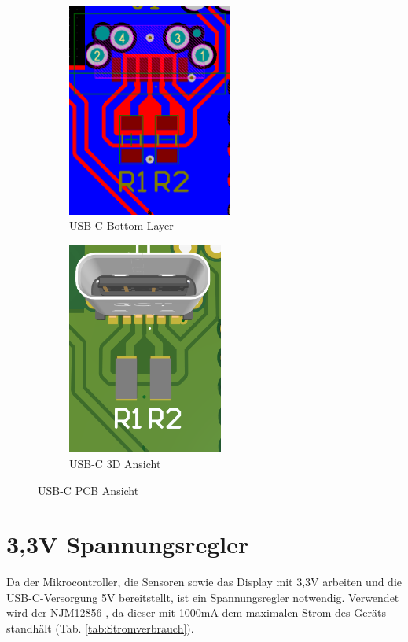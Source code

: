 \begin{inhalt}
\begin{figure}[H]
  \begin{subfigure}[b]{0.48\textwidth}
    \centering
    \includegraphics[height=7cm]{files/Tobias/pics/Schaltungen/PCB/USB_C_PCB.PNG}
    \caption{USB-C Bottom Layer}
    \label{fig:USB-C_Bottom_layer}
  \end{subfigure}
  \hfill
  \begin{subfigure}[b]{0.48\textwidth}
    \centering
    \includegraphics[height=7cm]{files/Tobias/pics/Schaltungen/PCB/USB_C_PCB_3D.PNG}
    \caption{USB-C 3D Ansicht}
    \label{fig:USB-C_3D_Ansicht}
  \end{subfigure}

  \caption{USB-C PCB Ansicht}
  \label{fig:pcb_layers}
\end{figure}



      \section{3,3V Spannungsregler}

Da der Mikrocontroller, die Sensoren sowie das Display mit 3,3V arbeiten und die USB-C-Versorgung 5V bereitstellt, ist ein Spannungsregler notwendig. Verwendet wird der NJM12856 \cite{NJM12856}, da dieser mit 1000mA dem maximalen Strom des Geräts standhält (Tab. \ref{tab:Stromverbrauch}).


\end{inhalt}
